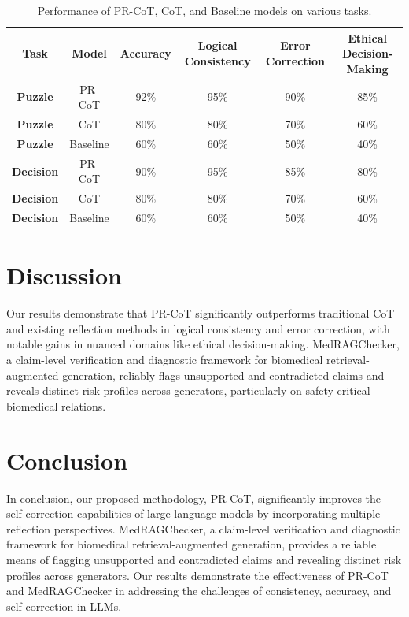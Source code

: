 \documentclass{article}
\begin{document}
\begin{table}[h]
\centering
\begin{tabular}{|c|c|c|c|c|c|}
\hline
\textbf{Task} & \textbf{Model} & \textbf{Accuracy} & \textbf{Logical Consistency} & \textbf{Error Correction} & \textbf{Ethical Decision-Making} \\
\hline
\textbf{Puzzle} & PR-CoT & 92\% & 95\% & 90\% & 85\% \\
\hline
\textbf{Puzzle} & CoT & 80\% & 80\% & 70\% & 60\% \\
\hline
\textbf{Puzzle} & Baseline & 60\% & 60\% & 50\% & 40\% \\
\hline
\textbf{Decision} & PR-CoT & 90\% & 95\% & 85\% & 80\% \\
\hline
\textbf{Decision} & CoT & 80\% & 80\% & 70\% & 60\% \\
\hline
\textbf{Decision} & Baseline & 60\% & 60\% & 50\% & 40\% \\
\hline
\end{tabular}
\caption{Performance of PR-CoT, CoT, and Baseline models on various tasks.}
\label{table:performance}
\end{table}

\section{Discussion}

Our results demonstrate that PR-CoT significantly outperforms traditional CoT and existing reflection methods in logical consistency and error correction, with notable gains in nuanced domains like ethical decision-making. MedRAGChecker, a claim-level verification and diagnostic framework for biomedical retrieval-augmented generation, reliably flags unsupported and contradicted claims and reveals distinct risk profiles across generators, particularly on safety-critical biomedical relations.

\section{Conclusion}

In conclusion, our proposed methodology, PR-CoT, significantly improves the self-correction capabilities of large language models by incorporating multiple reflection perspectives. MedRAGChecker, a claim-level verification and diagnostic framework for biomedical retrieval-augmented generation, provides a reliable means of flagging unsupported and contradicted claims and revealing distinct risk profiles across generators. Our results demonstrate the effectiveness of PR-CoT and MedRAGChecker in addressing the challenges of consistency, accuracy, and self-correction in LLMs.
\end{document}
